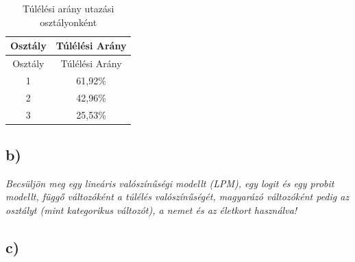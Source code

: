 \documentclass[
]{article}
\newenvironment{Shaded}{\begin{snugshade}}{\end{snugshade}}
\newcommand{\DataTypeTok}[1]{\textcolor[rgb]{0.13,0.29,0.53}{#1}}
\newcommand{\KeywordTok}[1]{\textcolor[rgb]{0.13,0.29,0.53}{\textbf{#1}}}
\newcommand{\NormalTok}[1]{#1}
\newcommand{\OperatorTok}[1]{\textcolor[rgb]{0.81,0.36,0.00}{\textbf{#1}}}
\newcommand{\StringTok}[1]{\textcolor[rgb]{0.31,0.60,0.02}{#1}}
\begin{document}
\begin{longtable}[]{@{}cc@{}}
\caption{Túlélési arány utazási osztályonként}\tabularnewline
\toprule
Osztály & Túlélési Arány\tabularnewline
\midrule
\endfirsthead
\toprule
Osztály & Túlélési Arány\tabularnewline
\midrule
\endhead
1 & 61,92\%\tabularnewline
2 & 42,96\%\tabularnewline
3 & 25,53\%\tabularnewline
\bottomrule
\end{longtable}

\hypertarget{b-3}{%
\subsection{b)}\label{b-3}}

\emph{Becsüljön meg egy lineáris valószínűségi modellt (LPM), egy logit
és egy probit modellt, függő változóként a túlélés valószínűségét,
magyarázó változóként pedig az osztályt (mint kategorikus változót), a
nemet és az életkort használva!}

\begin{Shaded}
\end{Shaded}

\hypertarget{c-2}{%
\subsection{c)}\label{c-2}}
\end{document}
